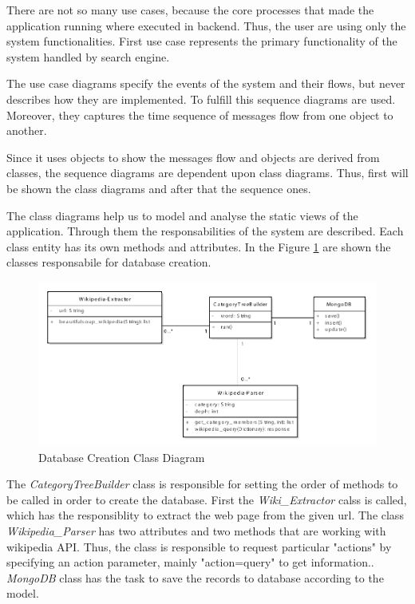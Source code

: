 There are not so many use cases, because the core processes that made the application running where executed in backend. Thus, the user are using only the system functionalities. First use case represents the primary functionality of the system handled by search engine. 

The use case diagrams specify the events of the system and their flows, but never describes how they are implemented. To fulfill this sequence diagrams are used. Moreover, they captures the time sequence of messages flow from one object to another. 

Since it uses objects to show the messages flow and objects are derived from classes, the sequence diagrams are dependent upon class diagrams. Thus, first will be shown the class diagrams and after that the sequence ones. 

The class diagrams help us to model and analyse the static views of the application. Through them the responsabilities of the system are described. Each class entity has its own methods and attributes. In the Figure \ref{classCreate_uml} are shown the classes responsabile for database creation. 

\begin{figure}[!ht]
\centering
\includegraphics[width=16cm]{create-db}
\caption{Database Creation Class Diagram}\label{classCreate_uml}
\end{figure}

The \textit{CategoryTreeBuilder} class is responsible for setting the order of methods to be called in order to create the database. First the \textit{Wiki\_Extractor} calss is called, which has the responsiblity to extract the web page from the given url. The class \textit{Wikipedia\_Parser} has two attributes and two methods that are working with wikipedia API. Thus, the class is responsible to request particular "actions" by specifying an action parameter, mainly "action=query" to get information.. \textit{MongoDB} class has the task to save the records to database according to the model.  

